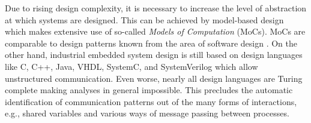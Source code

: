 
Due to rising design complexity, it is necessary to increase the level of abstraction at which systems are designed.
This can be achieved by model-based design which makes extensive use of so-called \emph{Models of Computation} \cite{embsft:2002} (MoCs).
MoCs are comparable to design patterns known from the area of software design \cite{gamma:1995}.
On the other hand, industrial embedded system design is still based on design languages like C, C++, Java, VHDL, SystemC, and SystemVerilog which allow unstructured communication.
Even worse, nearly all design languages are Turing complete making analyses in general impossible.
This precludes the automatic identification of communication patterns out of the many forms of interactions, e.g., shared variables and various ways of message passing between processes.



